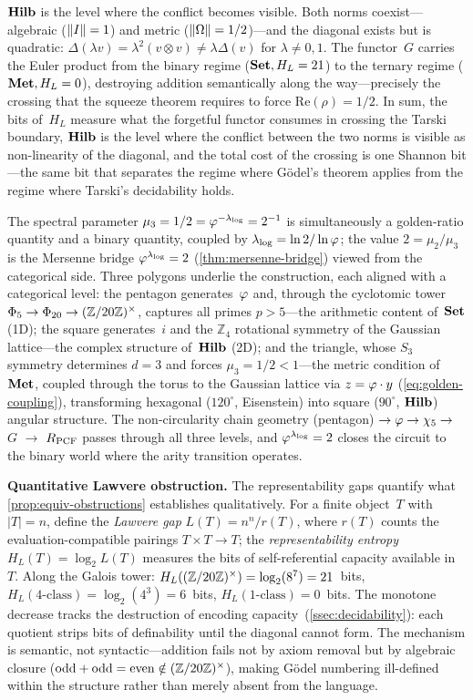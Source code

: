 $\mathbf{Hilb}$ is the level where the conflict becomes visible.  Both norms
coexist---algebraic ($\|I\|=1$) and metric
($\|\Omega\|=1/2$)---and the diagonal exists but is quadratic:
$\Delta(\lambda v) = \lambda^2(v\otimes v)\ne\lambda\Delta(v)$ for
$\lambda\ne 0,1$.  The functor~$G$ carries the Euler product from the binary regime
($\mathbf{Set}, H_L=21$) to the ternary regime ($\mathbf{Met}, H_L=0$), destroying addition semantically
along the way---precisely the crossing that the squeeze theorem
requires to force $\mathrm{Re}(\rho)=1/2$.
In sum, the bits of~$H_L$ measure what the forgetful functor consumes in
crossing the Tarski boundary, $\mathbf{Hilb}$ is the level where the conflict
between the two norms is visible as non-linearity of the diagonal, and
the total cost of the crossing is one Shannon bit---the same bit that
separates the regime where G\"odel's theorem applies from the regime
where Tarski's decidability holds.

The spectral parameter
$\mu_3 = 1/2 = \varphi^{-\lambda_{\log}} = 2^{-1}$ is simultaneously
a golden-ratio quantity and a binary quantity, coupled by
$\lambda_{\log}=\ln 2/\ln\varphi$; the value $2=\mu_2/\mu_3$ is the
Mersenne bridge $\varphi^{\lambda_{\log}}=2$
(\cref{thm:mersenne-bridge}) viewed from the categorical side.
Three polygons underlie the construction, each aligned with a
categorical level: the pentagon generates~$\varphi$ and, through the
cyclotomic tower $\Phi_5\to\Phi_{20}\to(\mathbb{Z}/20\mathbb{Z})^\times$, captures all
primes $p>5$---the arithmetic content of~$\mathbf{Set}$ (1D); the square
generates~$i$ and the $\mathbb{Z}_4$ rotational symmetry of the
Gaussian lattice---the complex structure of~$\mathbf{Hilb}$ (2D); and the
triangle, whose $S_3$ symmetry determines $d=3$ and forces
$\mu_3=1/2<1$---the metric condition of~$\mathbf{Met}$, coupled through the
torus to the Gaussian lattice via $z=\varphi\cdot y$
(\cref{eq:golden-coupling}), transforming hexagonal ($120^\circ$,
Eisenstein) into square ($90^\circ$, $\mathbf{Hilb}$) angular structure.  The
non-circularity chain geometry (pentagon) $\to \varphi \to \chi_5 \to$
$G$ $\to$ $R_{\mathrm{PCF}}$ passes through all three levels, and
$\varphi^{\lambda_{\log}}=2$ closes the circuit to the binary world
where the arity transition operates.

\smallskip\noindent\textbf{Quantitative Lawvere obstruction.}
The representability gaps quantify what
\cref{prop:equiv-obstructions} establishes qualitatively.
For a finite object~$T$ with $|T|=n$, define the \emph{Lawvere gap}
$L(T) = n^n / r(T)$, where $r(T)$ counts the evaluation-compatible
pairings $T\times T\to T$; the \emph{representability entropy}
$H_L(T) = \log_2 L(T)$ measures the bits of self-referential capacity
available in~$T$.  Along the Galois tower:
$H_L((\mathbb{Z}/20\mathbb{Z})^\times) = \log_2(8^7) = 21$~bits,
$H_L(\text{4-class}) = \log_2(4^3) = 6$~bits,
$H_L(\text{1-class}) = 0$~bits.  The monotone decrease tracks the
destruction of encoding capacity~(\cref{ssec:decidability}): each
quotient strips bits of definability until the diagonal cannot form.
The mechanism is semantic, not syntactic---addition fails not by axiom
removal but by algebraic closure
($\text{odd}+\text{odd}=\text{even}\notin(\mathbb{Z}/20\mathbb{Z})^\times$), making G\"odel
numbering ill-defined within the structure rather than merely absent
from the language.

